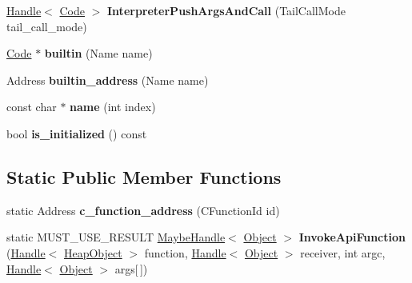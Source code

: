 \begin{DoxyCompactItemize}
\item 
\hyperlink{classv8_1_1internal_1_1_handle}{Handle}$<$ \hyperlink{classv8_1_1internal_1_1_code}{Code} $>$ {\bfseries Interpreter\+Push\+Args\+And\+Call} (Tail\+Call\+Mode tail\+\_\+call\+\_\+mode)\hypertarget{classv8_1_1internal_1_1_builtins_ab62234b4a2682c50bac052b42b803be9}{}\label{classv8_1_1internal_1_1_builtins_ab62234b4a2682c50bac052b42b803be9}

\item 
\hyperlink{classv8_1_1internal_1_1_code}{Code} $\ast$ {\bfseries builtin} (Name name)\hypertarget{classv8_1_1internal_1_1_builtins_a7c2862becc6cf484e05195a4f180b04f}{}\label{classv8_1_1internal_1_1_builtins_a7c2862becc6cf484e05195a4f180b04f}

\item 
Address {\bfseries builtin\+\_\+address} (Name name)\hypertarget{classv8_1_1internal_1_1_builtins_a7f2c4c5fa584b481598b346f42ac9a7e}{}\label{classv8_1_1internal_1_1_builtins_a7f2c4c5fa584b481598b346f42ac9a7e}

\item 
const char $\ast$ {\bfseries name} (int index)\hypertarget{classv8_1_1internal_1_1_builtins_a91b89e9e3abd524b033e20105c67243a}{}\label{classv8_1_1internal_1_1_builtins_a91b89e9e3abd524b033e20105c67243a}

\item 
bool {\bfseries is\+\_\+initialized} () const \hypertarget{classv8_1_1internal_1_1_builtins_a764c94df78f2579f0afc3023a8a4bf2f}{}\label{classv8_1_1internal_1_1_builtins_a764c94df78f2579f0afc3023a8a4bf2f}

\end{DoxyCompactItemize}
\subsection*{Static Public Member Functions}
\begin{DoxyCompactItemize}
\item 
static Address {\bfseries c\+\_\+function\+\_\+address} (C\+Function\+Id id)\hypertarget{classv8_1_1internal_1_1_builtins_a025a6664443f93abe1cb67d45d2845f8}{}\label{classv8_1_1internal_1_1_builtins_a025a6664443f93abe1cb67d45d2845f8}

\item 
static M\+U\+S\+T\+\_\+\+U\+S\+E\+\_\+\+R\+E\+S\+U\+LT \hyperlink{classv8_1_1internal_1_1_maybe_handle}{Maybe\+Handle}$<$ \hyperlink{classv8_1_1internal_1_1_object}{Object} $>$ {\bfseries Invoke\+Api\+Function} (\hyperlink{classv8_1_1internal_1_1_handle}{Handle}$<$ \hyperlink{classv8_1_1internal_1_1_heap_object}{Heap\+Object} $>$ function, \hyperlink{classv8_1_1internal_1_1_handle}{Handle}$<$ \hyperlink{classv8_1_1internal_1_1_object}{Object} $>$ receiver, int argc, \hyperlink{classv8_1_1internal_1_1_handle}{Handle}$<$ \hyperlink{classv8_1_1internal_1_1_object}{Object} $>$ args\mbox{[}$\,$\mbox{]})\hypertarget{classv8_1_1internal_1_1_builtins_a25190542421d5425d80d6f92eb98293e}{}\label{classv8_1_1internal_1_1_builtins_a25190542421d5425d80d6f92eb98293e}

\end{DoxyCompactItemize}
